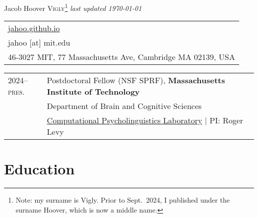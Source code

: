 \documentclass[11pt,a4paper]{article}
\begin{document}
\pagestyle{empty}
{\Huge{Jacob Hoover \scshape{Vigly}}\footnote{%
Note: my surname is Vigly. Prior to Sept.\ 2024, I published under the surname Hoover, which is now a middle name.%
}}
\hfill{}{\small\color{lightgray}\itshape last updated \monthyeardate\today}

\begin{tabular}{%
  l
}
  \href{https://jahoo.github.io}{jahoo.github.io}\\
  jahoo [at] mit.edu\\
  46-3027 MIT, 77 Massachusetts Ave, Cambridge MA 02139, USA\\
\end{tabular}

\vspace*{5pt}


\begin{longtable}{p{1.7cm}|p{15cm}}
  \textsc{2024--pres.}%
    &Postdoctoral Fellow (NSF SPRF),
    \textbf{Massachusetts Institute of Technology}\\
    &\quad{}Department of Brain and Cognitive Sciences\\
    &\quad{}\href{https://cpl.mit.edu}{Computational Psycholinguistics Laboratory} | PI: Roger Levy\\
  \end{longtable}

\section{Education}
\end{document}
